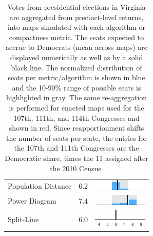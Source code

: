 \begin{table}
\begin{tabular}{l rm{7em}}
Population Distance    &   6.2 &       \includegraphics[width=7em]{mini_hist/VA_2016_dist_p} \\
Power Diagram          &   7.4 &        \includegraphics[width=7em]{mini_hist/VA_2016_power} \\
Split-Line             &   6.0 &        \includegraphics[width=7em]{mini_hist/VA_2016_split_ax} \\
\hline \hline
\end{tabular}
\caption{Votes from presidential elections in Virginia are aggregated from precinct-level returns, into maps simulated with each algorithm or compactness metric. 
             The seats expected to accrue to Democrats (mean across maps) are displayed numerically as well as by a solid black line.
             The normalized distribution of seats per metric/algorithm is shown in blue and the 10-90\% range of possible seats is highlighted in gray.
             The same re-aggregation is performed for enacted maps used for the 107th, 111th, and 114th Congresses and shown in red.
             Since reapportionment shifts the number of seats per state,
               the entries for the 107th and 111th Congresses are the Democratic share,
               times the 11 assigned after the 2010 Census.
             }\label{tab:VA_seats}
\end{table}
 